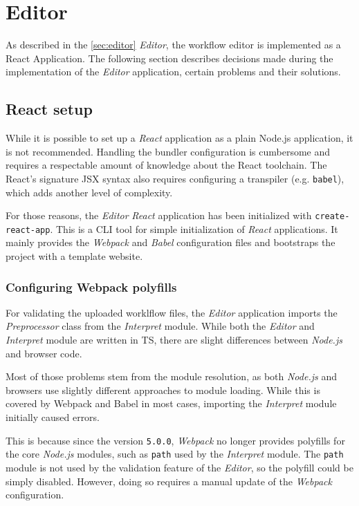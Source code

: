 \section{Editor}
As described in the \autoref{sec:editor} \textit{Editor}, the workflow editor is implemented as a React Application.
The following section describes decisions made during the implementation of the \textit{Editor} application,
certain problems and their solutions.

\subsection{React setup}
While it is possible to set up a \textit{React} application as a plain Node.js application, it is not recommended.
Handling the bundler configuration is cumbersome and requires a respectable amount of knowledge about the React toolchain.
The React's signature \acs{JSX} syntax also requires configuring a transpiler (e.g. \texttt{babel}), which adds another level of complexity.

For those reasons, the \textit{Editor} \textit{React} application has been initialized with \texttt{create-react-app}. 
This is a \ac{CLI} tool for simple initialization of \textit{React} applications.
It mainly provides the \textit{Webpack} and \textit{Babel} configuration files and bootstraps the project with a template website.

\subsubsection{Configuring Webpack polyfills}

For validating the uploaded worklflow files, the \textit{Editor} application imports the \textit{Preprocessor} class from the \textit{Interpret} module.
While both the \textit{Editor} and \textit{Interpret} module are written in \acl{TS}, there are slight differences between \textit{Node.js} and browser code.

Most of those problems stem from the module resolution, as both \textit{Node.js} and browsers use slightly different approaches to module loading.
While this is covered by Webpack and Babel in most cases, importing the \textit{Interpret} module initially caused errors.

This is because since the version \texttt{5.0.0}, \textit{Webpack} no longer provides polyfills for the core \textit{Node.js} modules, such as \texttt{path} used by the \textit{Interpret} module.
The \texttt{path} module is not used by the validation feature of the \textit{Editor}, so the polyfill could be simply disabled.
However, doing so requires a manual update of the \textit{Webpack} configuration.

